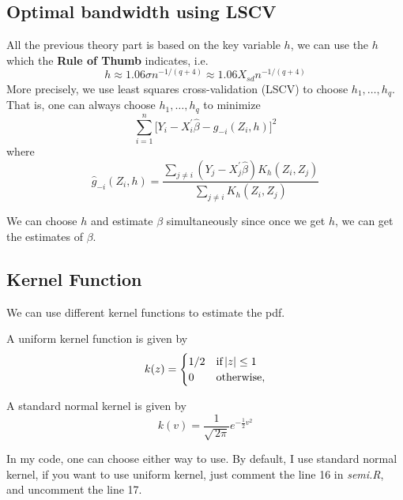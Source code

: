 \documentclass{article}
\begin{document}
\subsection{Optimal bandwidth using LSCV}
All the previous theory part is based on the key variable $h$, we can use the $h$ which the \textbf{Rule of Thumb} indicates, i.e.
\begin{equation}
 h \approx 1.06\sigma n^{-1/(q+4)} \approx 1.06 X_{sd}n^{-1/(q+4)}
 \end{equation}
More precisely, we use least squares cross-validation (LSCV) to choose $h_{1},\ldots,h_{q}$. That is, one can always choose $h_{1},\ldots,h_{q}$ to minimize
\begin{equation}
\sum_{i=1}^{n}\Big[Y_{i}-X^{\prime}_{i}\hat{\beta}-g_{-i}(Z_{i},h)\Big]^{2} \label{lscv}
\end{equation}
where
\begin{equation}
\hat{g}_{-i}(Z_{i},h) = \frac{\sum_{j\not=i}(Y_{j}-X_{j}^{\prime}\hat{\beta})K_{h}(Z_{i},Z_{j})}{\sum_{j\not=i}K_{h}(Z_{i},Z_{j})}
\end{equation}

We can choose $h$ and estimate $\beta$ simultaneously since once we get $h$, we can get the estimates of $\beta$.
\subsection{Kernel Function}
We can use different kernel functions to estimate the pdf.

A uniform kernel function is given by
\begin{equation}\label{uniform ker}
k(z)=
\begin{cases}
1/2 & \text{if\,} |z|\leq 1 \\
0   & \text{otherwise,}
\end{cases}
\end{equation}

A standard normal kernel is given by
\begin{equation}
    k(v) = \frac{1}{\sqrt{\,2\pi}}e^{-\frac{1}{2}v^{2}}\label{std normal ker}
\end{equation}

In my code, one can choose either way to use. By default, I use standard normal kernel, if you want to use uniform kernel, just comment the line 16 in \textit{semi.R}, and uncomment the line 17.
\end{document}
